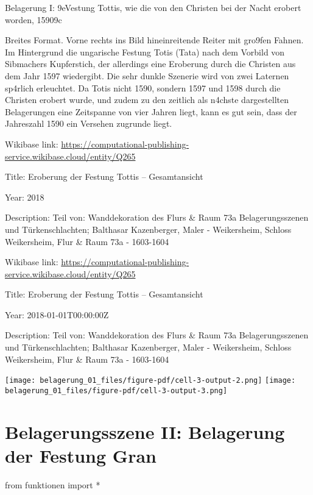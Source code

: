 \documentclass[
  a4paper,
  portrait]{book}
\newenvironment{Shaded}{\begin{snugshade}}{\end{snugshade}}
\newcommand{\ImportTok}[1]{\textcolor[rgb]{0.00,0.46,0.62}{#1}}
\newcommand{\NormalTok}[1]{\textcolor[rgb]{0.00,0.23,0.31}{#1}}
\newcommand{\OperatorTok}[1]{\textcolor[rgb]{0.37,0.37,0.37}{#1}}
\begin{document}
Belagerung I: \x9eVestung Tottis, wie die von den Christen bei
der Nacht erobert worden, 1590\x9c

Breites Format. Vorne rechts ins Bild hineinreitende Reiter mit
gro\x9fen Fahnen. Im Hintergrund die ungarische Festung Totis (Tata)
nach dem Vorbild von Sibmachers Kupferstich, der allerdings eine
Eroberung durch die Christen aus dem Jahr 1597 wiedergibt. Die sehr
dunkle Szenerie wird von zwei Laternen sp\xa4rlich erleuchtet. Da
Totis nicht 1590, sondern 1597 und 1598 durch die Christen erobert
wurde, und zudem zu den zeitlich als n\xa4chste dargestellten
Belagerungen eine Zeitspanne von vier Jahren liegt, kann es gut sein,
dass der Jahreszahl 1590 ein Versehen zugrunde liegt.

Wikibase link:
\url{https://computational-publishing-service.wikibase.cloud/entity/Q265}

Title: Eroberung der Festung Tottis -- Gesamtansicht

Year: 2018

Description: Teil von: Wanddekoration des Flurs \& Raum 73a
Belagerungsszenen und Türkenschlachten; Balthasar Kazenberger, Maler -
Weikersheim, Schloss Weikersheim, Flur \& Raum 73a - 1603-1604

Wikibase link:
\url{https://computational-publishing-service.wikibase.cloud/entity/Q265}

Title: Eroberung der Festung Tottis -- Gesamtansicht

Year: 2018-01-01T00:00:00Z

Description: Teil von: Wanddekoration des Flurs \& Raum 73a
Belagerungsszenen und Türkenschlachten; Balthasar Kazenberger, Maler -
Weikersheim, Schloss Weikersheim, Flur \& Raum 73a - 1603-1604

\texttt{[image: belagerung\_01\_files/figure-pdf/cell-3-output-2.png]}
\texttt{[image: belagerung\_01\_files/figure-pdf/cell-3-output-3.png]}

\chapter{Belagerungsszene II: Belagerung der Festung
Gran}\label{belagerungsszene-ii-belagerung-der-festung-gran}

\begin{Shaded}
\begin{Highlighting}[]
\ImportTok{from}\NormalTok{ funktionen }\ImportTok{import} \OperatorTok{*}
\end{Highlighting}
\end{Shaded}
\end{document}

